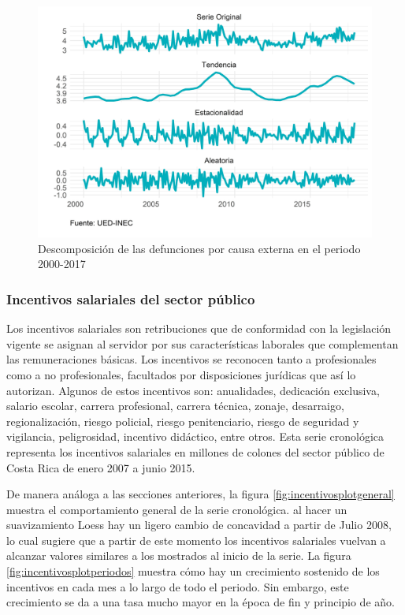 \documentclass[
]{article}
\begin{document}
\begin{figure}[H]
\includegraphics[width=1\linewidth,height=1\textheight]{Tesis_files/figure-latex/externasplotdescomposicion-1} \caption{Descomposición de las defunciones por causa externa en el periodo 2000-2017}\label{fig:externasplotdescomposicion}
\end{figure}

\subsubsection{Incentivos salariales del sector público}

Los incentivos salariales son retribuciones que de conformidad con la
legislación vigente se asignan al servidor por sus características
laborales que complementan las remuneraciones básicas. Los incentivos se
reconocen tanto a profesionales como a no profesionales, facultados por
disposiciones jurídicas que así lo autorizan. Algunos de estos
incentivos son: anualidades, dedicación exclusiva, salario escolar,
carrera profesional, carrera técnica, zonaje, desarraigo,
regionalización, riesgo policial, riesgo penitenciario, riesgo de
seguridad y vigilancia, peligrosidad, incentivo didáctico, entre otros.
Esta serie cronológica representa los incentivos salariales en millones
de colones del sector público de Costa Rica de enero 2007 a junio 2015.

De manera análoga a las secciones anteriores, la figura
\ref{fig:incentivosplotgeneral} muestra el comportamiento general de la
serie cronológica. al hacer un suavizamiento Loess hay un ligero cambio
de concavidad a partir de Julio 2008, lo cual sugiere que a partir de
este momento los incentivos salariales vuelvan a alcanzar valores
similares a los mostrados al inicio de la serie. La figura
\ref{fig:incentivosplotperiodos} muestra cómo hay un crecimiento
sostenido de los incentivos en cada mes a lo largo de todo el periodo.
Sin embargo, este crecimiento se da a una tasa mucho mayor en la época
de fin y principio de año.
\end{document}

